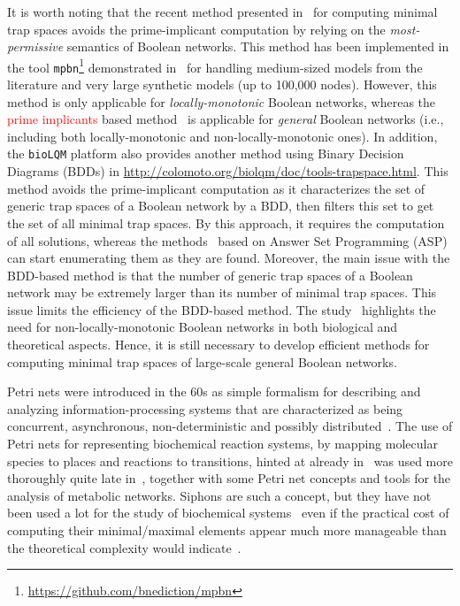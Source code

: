 \documentclass[preprint,12pt]{elsarticle}
\newcommand{\change}[1]{\textcolor{red}{#1}}
\begin{document}
It is worth noting that the recent method presented in~\cite{DBLP:conf/ictai/ChevalierFPZ19} for computing minimal trap spaces avoids the prime-implicant computation by relying on the \emph{most-permissive} semantics of Boolean networks.
This method has been implemented in the tool \texttt{mpbn}\footnote{\url{https://github.com/bnediction/mpbn}} demonstrated in~\cite{Paulev2020} for handling medium-sized models from the literature and very large synthetic models (up to 100,000 nodes).
However, this method is only applicable for \emph{locally-monotonic} Boolean networks, whereas the \change{prime implicants} based method~\cite{klarner2015computing} is applicable for \emph{general} Boolean networks (i.e., including both locally-mono\-tonic and non-locally-monotonic ones).
In addition, the \texttt{bioLQM} platform also provides another method using Binary Decision Diagrams (BDDs) in \url{http://colomoto.org/biolqm/doc/tools-trapspace.html}.
This method avoids the prime-implicant computation as it characterizes the set of generic trap spaces of a Boolean network by a BDD, then filters this set to get the set of all minimal trap spaces.
By this approach, it requires the computation of all solutions, whereas the methods~\cite{klarner2015computing,Paulev2020} based on Answer Set Programming (ASP) can start enumerating them as they are found.
Moreover, the main issue with the BDD-based method is that the number of generic trap spaces of a Boolean network may be extremely larger than its number of minimal trap spaces.
This issue limits the efficiency of the BDD-based method.
The study~\cite{DBLP:journals/tcs/NoualRS13} highlights the need for non-locally-monotonic Boolean networks in both biological and theoretical aspects.
Hence, it is still necessary to develop efficient methods for computing minimal trap spaces of large-scale general Boolean networks.

Petri nets were introduced in the 60s as simple formalism for describing and analyzing information-processing systems that are characterized as being concurrent, asynchronous, non-deterministic and possibly distributed~\cite{peterson1981petri,Murata1989}.
The use of Petri nets for representing biochemical reaction systems, by mapping molecular species to places and reactions to transitions, hinted at already in~\cite{peterson1981petri,Murata1989} was used more thoroughly quite late in~\cite{reddy1993petri}, together with some Petri net concepts and tools for the analysis of metabolic networks.
Siphons are such a concept, but they have not been used a lot for the study of biochemical systems~\cite{zevedei2003topological,blatke2015biomodel} even if the practical cost of computing their minimal/maximal elements appear much more manageable than the theoretical complexity would indicate~\cite{oanea2010new,nabli2016enumerating}.
\end{document}
